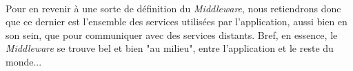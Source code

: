 {  \paragraph{} Pour en revenir à une sorte de définition du \textit{Middleware}, nous retiendrons
  donc que ce dernier est l'ensemble des services utilisées par l'application, aussi bien en son
  sein, que pour communiquer avec des services distants. Bref, en essence, le \textit{Middleware} se
  trouve bel et bien "au milieu", entre l'application et le reste du monde...}

